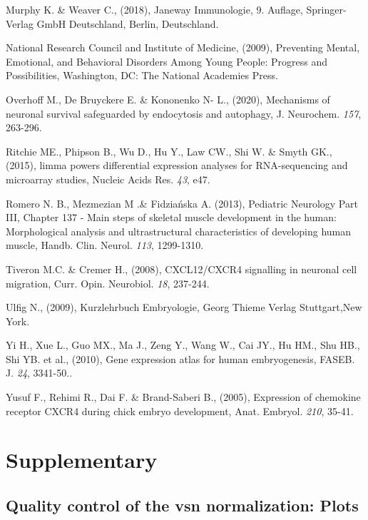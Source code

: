\documentclass[
]{article}
\begin{document}
Murphy K. \& Weaver C., (2018), Janeway Immunologie, 9. Auflage, Springer-Verlag GmbH Deutschland, Berlin, Deutschland.

National Research Council and Institute of Medicine, (2009), Preventing Mental, Emotional, and Behavioral Disorders Among Young People: Progress and Possibilities, Washington, DC: The National Academies Press.

Overhoff M., De Bruyckere E. \& Kononenko N- L., (2020), Mechanisms of neuronal survival safeguarded by endocytosis and autophagy, J. Neurochem. \emph{157}, 263-296.

Ritchie ME., Phipson B., Wu D., Hu Y., Law CW., Shi W. \& Smyth GK., (2015), limma powers differential expression analyses for RNA-sequencing and microarray studies, Nucleic Acids Res. \emph{43}, e47.

Romero N. B., Mezmezian M .\& Fidziańska A. (2013), Pediatric Neurology Part III, Chapter 137 - Main steps of skeletal muscle development in the human: Morphological analysis and ultrastructural characteristics of developing human muscle, Handb. Clin. Neurol. \emph{113}, 1299-1310.

Tiveron M.C. \& Cremer H., (2008), CXCL12/CXCR4 signalling in neuronal cell migration, Curr. Opin. Neurobiol. \emph{18}, 237-244.

Ulfig N., (2009), Kurzlehrbuch Embryologie, Georg Thieme Verlag Stuttgart,New York.

Yi H., Xue L., Guo MX., Ma J., Zeng Y., Wang W., Cai JY., Hu HM., Shu HB., Shi YB. et al., (2010), Gene expression atlas for human embryogenesis, FASEB. J. \emph{24}, 3341-50..

Yusuf F., Rehimi R., Dai F. \& Brand-Saberi B., (2005), Expression of chemokine receptor CXCR4 during chick embryo development, Anat. Embryol. \emph{210}, 35-41.

\newpage

\hypertarget{supplementary}{%
\section{Supplementary}\label{supplementary}}

\hypertarget{quality-control-of-the-vsn-normalization-plots}{%
\subsection{Quality control of the vsn normalization: Plots}\label{quality-control-of-the-vsn-normalization-plots}}
\end{document}
